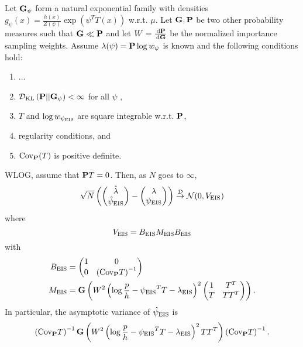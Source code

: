 \begin{theorem}
    \label{thm:clt-eis}
    Let $\G_{\psi}$ form a natural exponential family with densities $g_{\psi}(x) = \frac{h(x)}{Z(\psi)} \exp \left( \psi^{T}T(x) \right)$ w.r.t. $\mu$. Let $\G, \P$ be two other probability measures such that $\G \ll \P$ and let $W = \frac{\d\P}{\d\G}$ be the normalized importance sampling weights. 
    Assume $\lambda(\psi) = \P \log w_{\psi}$ is known and the following conditions hold:
    \begin{enumerate}[label={\bfseries(B\arabic*)}]
        \item ...
        \item\label{it:eis-dkl-dkl-to-base-finite} $\Dkl{\P}{\G_{\psi}} < \infty$ for all $\psi$ ,
        \item\label{it:eis-T-l2} $T$ and $\log w_{\peis}$ are square integrable w.r.t. $\P$,
        \item\label{it:eis-dkl-regularity} regularity conditions, and
        \item\label{it:eis-cov-t-spd} $\cov_{\P} (T)$ is positive definite.
    \end{enumerate}

    WLOG, assume that $\P T = 0$. Then, as $N$ goes to $\infty$,
    $$
    \sqrt{N} \left( \begin{pmatrix}\hat\lambda \\ \hpeis\end{pmatrix} - \begin{pmatrix}\lambda \\ \peis\end{pmatrix} \right) \Dto \mathcal N(0, V_{\eis})
    $$
    where 
    $$
    V_{\eis} = B_{\eis}M_{\eis}B_{\eis}
    $$
    with
    \begin{align*}
        B_{\eis} &= \begin{pmatrix}
            1 & 0 \\
            0 & \left(\cov_{\P} T\right)^{-1}
        \end{pmatrix}\\
        M_{\eis} &= \G \left(W^{2} \left( \log \frac{p}{h} - \peis^{T}T - \lambda_{\eis}\right)^{2} \begin{pmatrix}
            1& T^{T}\\
             T &  TT^{T}
        \end{pmatrix}
        \right).
    \end{align*}
    In particular, the asymptotic variance of $\hpeis$ is
    $$
    \left( \cov_{\P} T \right)^{-1} \G\left( W^{2} \left( \log \frac{p}{h} - \peis^{T}T - \lambda_{\eis} \right)^{2} T T ^{T} \right)\left( \cov_{\P} T \right)^{-1}.
    $$
\end{theorem}

